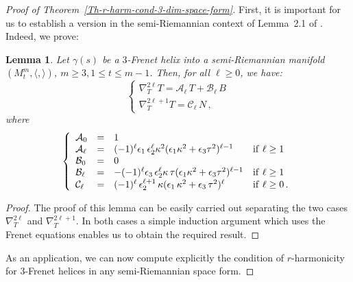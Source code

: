 \documentclass[11pt]{amsart}
\theoremstyle{plain}
\newtheorem{lemma}        [theorem]  {Lemma}
\theoremstyle{definition}
\numberwithin{equation}{section}
\def \link {~}
\begin{document}
\begin{proof}[Proof of Theorem~\ref{Th-r-harm-cond-3-dim-space-form}]
First, it is important for us to establish a version in the semi-Riemannian  context of Lemma\link2.1 of \cite{MR4542687}. Indeed, we prove:

\begin{lemma}\label{lemma-Branding-nablaelle-pseudo}
Let $\gamma(s)$ be a $3$-Frenet helix into a semi-Riemannian manifold $(M^m_t, \langle,\rangle)$, $m \geq 3, 1 \leq t \leq m-1$. Then, for all $\ell \geq 0$, we have:
\begin{equation}\label{formula-nablaelleTT-3-Frenet-pseudo}
\begin{cases}
\nabla_T^{2\ell} T= {\mathcal A}_\ell \, T + {\mathcal B}_\ell\,B \\
\nabla_T^{2\ell+1} T={\mathcal C}_\ell\,N\,,
\end{cases} 
\end{equation}
where
\begin{equation}\label{eq-abc}
\left \{
\begin{array}{llll}
{\mathcal A}_0&=& 1 &\\
{\mathcal A}_\ell&=&(-1)^{\ell} \epsilon_1 \,\epsilon_2^{\ell} \kappa^2 (\epsilon_1\kappa^2 + \epsilon_3 \tau^2)^{\ell - 1} & {\rm if} \,\, \ell \geq 1\\
{\mathcal B}_0&=& 0 &\\
{\mathcal B}_\ell&=&-(-1)^{\ell} \epsilon_3\,\epsilon_2^{\ell} \kappa\,\tau (\epsilon_1\kappa^2 + \epsilon_3 \tau^2)^{\ell - 1} & {\rm if} \,\, \ell \geq 1\\
{\mathcal C}_\ell&=& (-1)^{\ell}\,\epsilon_2^{\ell + 1}\, \kappa (\epsilon_1 \, \kappa^2 + \epsilon_3 \, \tau^2)^\ell& {\rm if} \,\, \ell \geq 0\,.
\end{array} \right .
\end{equation}
\end{lemma}
\begin{proof} The proof of this lemma can be easily carried out separating the two cases $\nabla_T^{2\ell} $ and  $\nabla_T^{2\ell+1} $. In both cases a simple induction argument which uses the Frenet equations enables us to obtain the required result.
\end{proof}
As an application, we can now compute explicitly the condition of $r$-harmoni\-city for $3$-Frenet helices in any semi-Riemannian space form.


\end{proof}
\end{document}
